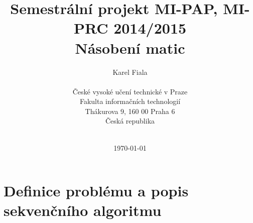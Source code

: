 \documentclass[12pt,a4paper]{article}
\begin{document}
\title{Semestrální projekt MI-PAP, MI-PRC 2014/2015\\
Násobení matic \\
\vspace{10px}}
\author{Karel Fiala \\
\vspace{10px} \\
\small České vysoké učení technické v Praze\\
\small Fakulta informačních technologií\\
\small Thákurova 9, 160 00 Praha 6\\
\small Česká republika \\
\vspace{10px} \\
}
\date{\today}
\maketitle



%
%
%

\clearpage
\tableofcontents
\clearpage

\section{Definice problému a popis sekvenčního algoritmu}
\end{document}
